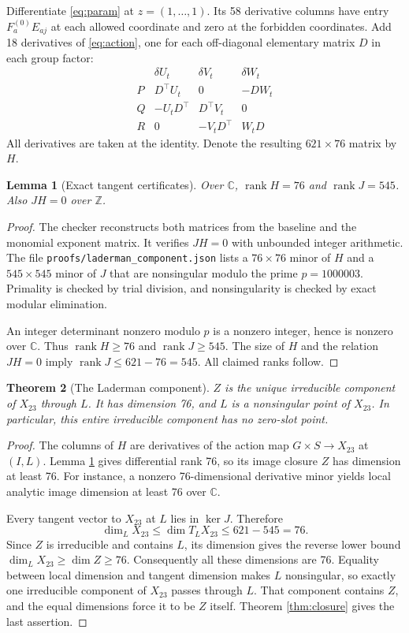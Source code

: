 \documentclass[11pt,letterpaper]{article}
\newtheorem{theorem}{Theorem}[section]
\newtheorem{lemma}[theorem]{Lemma}
\theoremstyle{definition}\newtheorem{definition}[theorem]{Definition}
\theoremstyle{remark}\newtheorem{remark}[theorem]{Remark}
\newcommand{\CC}{\mathbb C}\newcommand{\ZZ}{\mathbb Z}\newcommand{\QQ}{\mathbb Q}
\DeclareMathOperator{\rank}{rank}\DeclareMathOperator{\tr}{tr}
\newcommand{\file}[1]{\nolinkurl{#1}}
\begin{document}
Differentiate \eqref{eq:param} at $z=(1,\ldots,1)$. Its 58 derivative
columns have entry $F_a^{(0)}E_{aj}$ at each allowed coordinate and zero
at the forbidden coordinates. Add 18 derivatives of \eqref{eq:action},
one for each off-diagonal elementary matrix $D$ in each group factor:
\begin{equation}\label{eq:directions}
\begin{array}{c|ccc}
 &\delta U_t&\delta V_t&\delta W_t\\ \hline
P&D^\top U_t&0&-DW_t\\
Q&-U_tD^\top&D^\top V_t&0\\
R&0&-V_tD^\top&W_tD
\end{array}
\end{equation}
All derivatives are taken at the identity. Denote the resulting
$621\times76$ matrix by $H$.

\begin{lemma}[Exact tangent certificates]\label{lem:tangent}
Over $\CC$, $\rank H=76$ and $\rank J=545$. Also $JH=0$ over $\ZZ$.
\end{lemma}
\begin{proof}
The checker reconstructs both matrices from the baseline and the
monomial exponent matrix. It verifies $JH=0$ with unbounded integer
arithmetic. The file \file{proofs/laderman_component.json} lists a
$76\times76$ minor of $H$ and a $545\times545$ minor of $J$ that are
nonsingular modulo the prime $p=1000003$. Primality is checked by trial
division, and nonsingularity is checked by exact modular elimination.

An integer determinant nonzero modulo $p$ is a nonzero integer, hence is
nonzero over $\CC$. Thus $\rank H\ge76$ and $\rank J\ge545$. The size of
$H$ and the relation $JH=0$ imply
$\rank J\le621-76=545$. All claimed ranks follow.
\end{proof}

\begin{theorem}[The Laderman component]\label{thm:component}
$Z$ is the unique irreducible component of $X_{23}$ through $L$.
It has dimension 76, and $L$ is a nonsingular point of $X_{23}$.
In particular, this entire irreducible component has no zero-slot point.
\end{theorem}
\begin{proof}
The columns of $H$ are derivatives of the action map $G\times S\to X_{23}$
at $(I,L)$. Lemma \ref{lem:tangent} gives differential rank 76, so its
image closure $Z$ has dimension at least 76. For instance, a nonzero
76-dimensional derivative minor yields local analytic image dimension
at least 76 over $\CC$.

Every tangent vector to $X_{23}$ at $L$ lies in $\ker J$. Therefore
\[
\dim_L X_{23}\le\dim T_LX_{23}\le621-545=76.
\]
Since $Z$ is irreducible and contains $L$, its dimension gives the reverse
lower bound $\dim_LX_{23}\ge\dim Z\ge76$. Consequently all these dimensions
are 76. Equality between local dimension and tangent dimension makes $L$
nonsingular, so exactly one irreducible component of $X_{23}$ passes
through $L$. That component contains $Z$, and the equal dimensions force
it to be $Z$ itself. Theorem \ref{thm:closure} gives the last assertion.
\end{proof}
\end{document}
